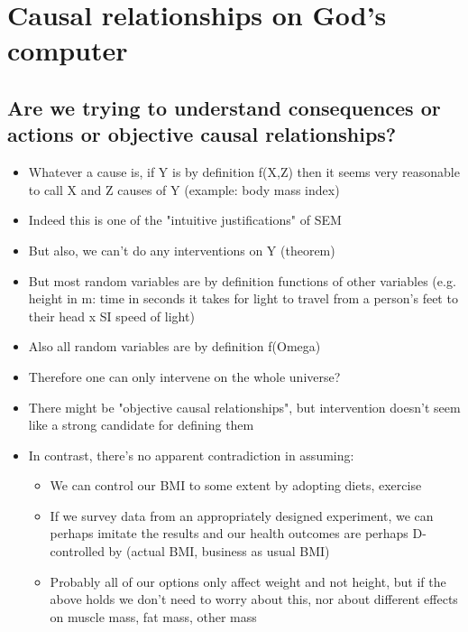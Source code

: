 

\chapter{Causal relationships on God's computer}\label{ch:6}


\section{Are we trying to understand consequences or actions or objective causal relationships?}

\begin{itemize}
    \item Whatever a cause is, if Y is by definition f(X,Z) then it seems very reasonable to call X and Z causes of Y (example: body mass index)
    \item Indeed this is one of the "intuitive justifications" of SEM
    \item But also, we can't do any interventions on Y (theorem)
    \item But most random variables are by definition functions of other variables (e.g. height in m: time in seconds it takes for light to travel from a person's feet to their head x SI speed of light)
    \item Also all random variables are by definition f(Omega)
    \item Therefore one can only intervene on the whole universe?
    \item There might be "objective causal relationships", but intervention doesn't seem like a strong candidate for defining them
    \item In contrast, there's no apparent contradiction in assuming:
    \begin{itemize}
        \item We can control our BMI to some extent by adopting diets, exercise
        \item If we survey data from an appropriately designed experiment, we can perhaps imitate the results and our health outcomes are perhaps D-controlled by (actual BMI, business as usual BMI)
        \item Probably all of our options only affect weight and not height, but if the above holds we don't need to worry about this, nor about different effects on muscle mass, fat mass, other mass
    \end{itemize}
\end{itemize}

